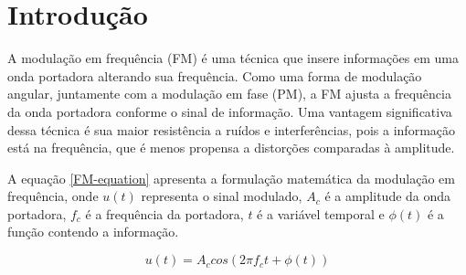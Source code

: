 \section{Introdução}
A modulação em frequência (FM) é uma técnica que insere informações em uma onda portadora alterando sua frequência. Como uma forma de modulação angular, juntamente com a modulação em fase (PM), a FM ajusta a frequência da onda portadora conforme o sinal de informação. Uma vantagem significativa dessa técnica é sua maior resistência a ruídos e interferências, pois a informação está na frequência, que é menos propensa a distorções comparadas à amplitude.

A equação \ref{FM-equation} apresenta a formulação matemática da modulação em frequência, onde $u(t)$ representa o sinal modulado, $A_c$ é a amplitude da onda portadora, $f_c$ é a frequência da portadora, $t$ é a variável temporal e $\phi(t)$ é a função contendo a informação.

\begin{equation}
    u(t) = A_{c}cos(2\pi f_{c}t+\phi(t))
    \label{FM-equation}
\end{equation}
